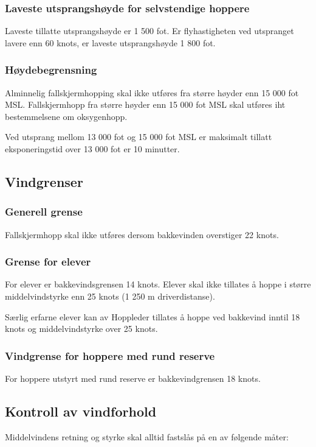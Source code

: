 \subsubsection{Laveste utsprangshøyde for selvstendige hoppere}
Laveste tillatte utsprangshøyde er 1 500 fot. Er flyhastigheten ved utspranget lavere enn 60 knots, er laveste utsprangshøyde 1 800 fot.

\subsubsection{Høydebegrensning}
Alminnelig fallskjermhopping skal ikke utføres fra større høyder enn 15 000 fot MSL. Fallskjermhopp fra større høyder enn 15 000 fot MSL skal utføres iht bestemmelsene om oksygenhopp.

Ved utsprang mellom 13 000 fot og 15 000 fot MSL er maksimalt tillatt eksponeringstid over 13 000 fot er 10 minutter.

\subsection{Vindgrenser}
\subsubsection{Generell grense}
Fallskjermhopp skal ikke utføres dersom bakkevinden overstiger 22 knots.

\subsubsection{Grense for elever}
For elever er bakkevindsgrensen 14 knots. Elever skal ikke tillates å hoppe i større middelvindstyrke enn 25 knots (1 250 m driverdistanse).

Særlig erfarne elever kan av Hoppleder tillates å hoppe ved bakkevind inntil 18 knots og middelvindstyrke over 25 knots.

\subsubsection{Vindgrense for hoppere med rund reserve}
For hoppere utstyrt med rund reserve er bakkevindgrensen 18 knots.

\subsection{Kontroll av vindforhold}
Middelvindens retning og styrke skal alltid fastslås på en av følgende måter:

